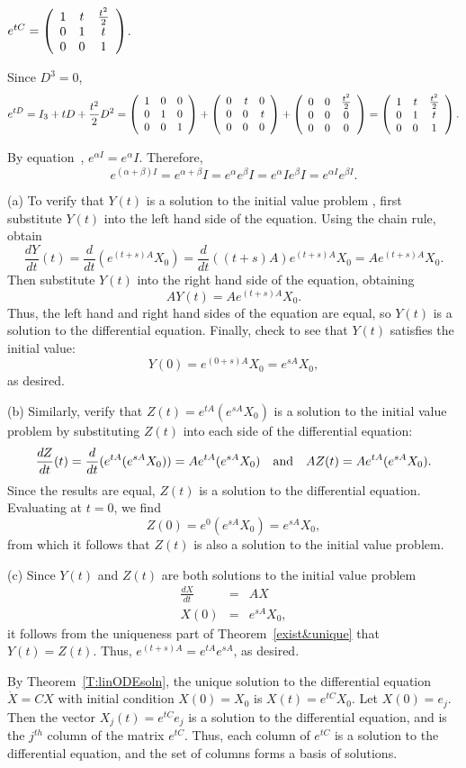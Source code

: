  \ans $e^{tC} =
\left(\begin{array}{ccc} 1 & t & \frac{t^2}{2} \\ 0 & 1 & t \\ 0 & 0 & 1\end{array}\right)$.

\soln Since $D^3 = 0$,
\[
e^{tD} = I_3 + tD + \frac{t^2}{2}D^2 =
\left(\begin{array}{rrr} 1 & 0 & 0 \\ 0 & 1 & 0 \\ 0 & 0 & 1\end{array}\right) +
\left(\begin{array}{rrr} 0 & t & 0 \\ 0 & 0 & t \\ 0 & 0 & 0\end{array}\right) +
\left(\begin{array}{ccc} 0 & 0 & \frac{t^2}{2} \\ 0 & 0 & 0 \\ 0 & 0 & 0\end{array}\right) =
\left(\begin{array}{ccc} 1 & t & \frac{t^2}{2} \\ 0 & 1 & t \\ 0 & 0 & 1\end{array}\right).
\]

By equation~, $e^{\alpha I} = e^\alpha I$.  Therefore,
\[ e^{(\alpha + \beta)I} = e^{\alpha + \beta}I = e^\alpha e^\beta I
= e^\alpha I e^\beta I = e^{\alpha I}e^{\beta I}. \]

(a) To verify that $Y(t)$ is a solution to the initial value problem
, first substitute $Y(t)$ into the left hand side of the
equation.  Using the chain rule, obtain
\[
\frac{dY}{dt}(t) = \frac{d}{dt}(e^{(t + s)A}X_0) =
\frac{d}{dt}((t + s)A)e^{(t + s)A}X_0 = Ae^{(t + s)A}X_0.
\]
Then substitute $Y(t)$ into the right hand side of the equation, obtaining
\[
AY(t) = Ae^{(t + s)A}X_0.
\]
Thus, the left hand and right hand sides of the equation are equal, so
$Y(t)$ is a solution to the differential equation.  Finally, check to see
that $Y(t)$ satisfies the initial value:
\[
Y(0) = e^{(0 + s)A}X_0 = e^{sA}X_0,
\]
as desired.

(b) Similarly, verify that $Z(t) = e^{tA}(e^{sA}X_0)$ is a solution to the
initial value problem by substituting $Z(t)$ into each side of the
differential equation:
\[
\frac{dZ}{dt}(t) = \frac{d}{dt}(e^{tA}(e^{sA}X_0))
= Ae^{tA}(e^{sA}X_0) \quad\mbox{and}\quad
AZ(t) = Ae^{tA}(e^{sA}X_0).
\]
Since the results are equal, $Z(t)$ is a solution to the differential
equation.  Evaluating at $t = 0$, we find
\[
Z(0) = e^{0}(e^{sA}X_0) = e^{sA}X_0,
\]
from which it follows that $Z(t)$ is also a solution to the initial
value problem.

(c) Since $Y(t)$ and $Z(t)$ are both solutions to the initial value problem
\[
\begin{array}{rcl}
\frac{dX}{dt} & = & AX \\
X(0) & = & e^{sA}X_0,
\end{array}
\]
it follows from the uniqueness part of Theorem~\ref{exist&unique} that
$Y(t) = Z(t)$.  Thus, $e^{(t + s)A} = e^{tA}e^{sA}$, as desired.

 By Theorem~\ref{T:linODEsoln},
the unique solution to the differential equation $\dot{X} = CX$ with
initial condition $X(0) = X_0$ is $X(t) = e^{tC}X_0$.  Let $X(0) =
e_j$.  Then the vector $X_j(t) = e^{tC}e_j$ is a solution to the
differential equation, and is the $j^{th}$ column of the matrix
$e^{tC}$.  Thus, each column of $e^{tC}$ is a solution to the
differential equation, and the set of columns forms a basis of
solutions.


